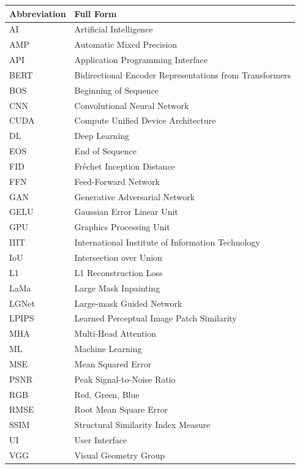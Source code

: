 \noindent\begin{tabular}{ll}
\hline
\textbf{Abbreviation} & \textbf{Full Form} \\
\hline
AI      & Artificial Intelligence \\
AMP     & Automatic Mixed Precision \\
API     & Application Programming Interface \\
BERT    & Bidirectional Encoder Representations from Transformers \\
BOS     & Beginning of Sequence \\
CNN     & Convolutional Neural Network \\
CUDA    & Compute Unified Device Architecture \\
DL      & Deep Learning \\
EOS     & End of Sequence \\
FID     & Fr\'echet Inception Distance \\
FFN     & Feed-Forward Network \\
GAN     & Generative Adversarial Network \\
GELU    & Gaussian Error Linear Unit \\
GPU     & Graphics Processing Unit \\
IIIT    & International Institute of Information Technology \\
IoU     & Intersection over Union \\
L1      & L1 Reconstruction Loss \\
LaMa    & Large Mask Inpainting \\
LGNet   & Large-mask Guided Network \\
LPIPS   & Learned Perceptual Image Patch Similarity \\
MHA     & Multi-Head Attention \\
ML      & Machine Learning \\
MSE     & Mean Squared Error \\
PSNR    & Peak Signal-to-Noise Ratio \\
RGB     & Red, Green, Blue \\
RMSE    & Root Mean Square Error \\
SSIM    & Structural Similarity Index Measure \\
UI      & User Interface \\
VGG     & Visual Geometry Group \\
\hline
\end{tabular}
